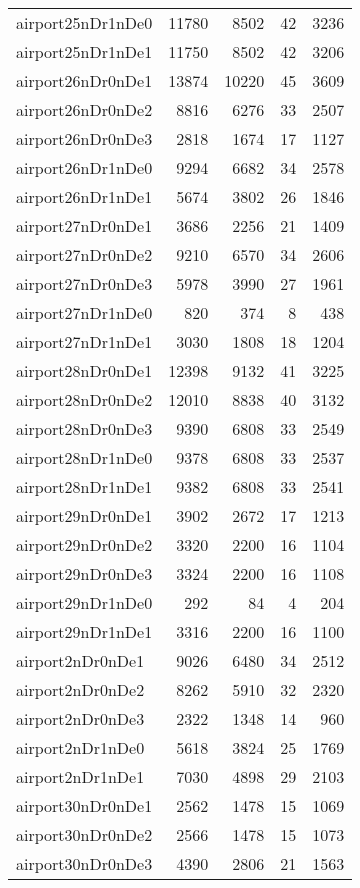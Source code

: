 \begin{tabular}{lrrrr}
airport25nDr1nDe0 & 11780 & 8502 & 42 & 3236 \\
airport25nDr1nDe1 & 11750 & 8502 & 42 & 3206 \\
airport26nDr0nDe1 & 13874 & 10220 & 45 & 3609 \\
airport26nDr0nDe2 & 8816 & 6276 & 33 & 2507 \\
airport26nDr0nDe3 & 2818 & 1674 & 17 & 1127 \\
airport26nDr1nDe0 & 9294 & 6682 & 34 & 2578 \\
airport26nDr1nDe1 & 5674 & 3802 & 26 & 1846 \\
airport27nDr0nDe1 & 3686 & 2256 & 21 & 1409 \\
airport27nDr0nDe2 & 9210 & 6570 & 34 & 2606 \\
airport27nDr0nDe3 & 5978 & 3990 & 27 & 1961 \\
airport27nDr1nDe0 & 820 & 374 & 8 & 438 \\
airport27nDr1nDe1 & 3030 & 1808 & 18 & 1204 \\
airport28nDr0nDe1 & 12398 & 9132 & 41 & 3225 \\
airport28nDr0nDe2 & 12010 & 8838 & 40 & 3132 \\
airport28nDr0nDe3 & 9390 & 6808 & 33 & 2549 \\
airport28nDr1nDe0 & 9378 & 6808 & 33 & 2537 \\
airport28nDr1nDe1 & 9382 & 6808 & 33 & 2541 \\
airport29nDr0nDe1 & 3902 & 2672 & 17 & 1213 \\
airport29nDr0nDe2 & 3320 & 2200 & 16 & 1104 \\
airport29nDr0nDe3 & 3324 & 2200 & 16 & 1108 \\
airport29nDr1nDe0 & 292 & 84 & 4 & 204 \\
airport29nDr1nDe1 & 3316 & 2200 & 16 & 1100 \\
airport2nDr0nDe1 & 9026 & 6480 & 34 & 2512 \\
airport2nDr0nDe2 & 8262 & 5910 & 32 & 2320 \\
airport2nDr0nDe3 & 2322 & 1348 & 14 & 960 \\
airport2nDr1nDe0 & 5618 & 3824 & 25 & 1769 \\
airport2nDr1nDe1 & 7030 & 4898 & 29 & 2103 \\
airport30nDr0nDe1 & 2562 & 1478 & 15 & 1069 \\
airport30nDr0nDe2 & 2566 & 1478 & 15 & 1073 \\
airport30nDr0nDe3 & 4390 & 2806 & 21 & 1563 \\

\end{tabular}
